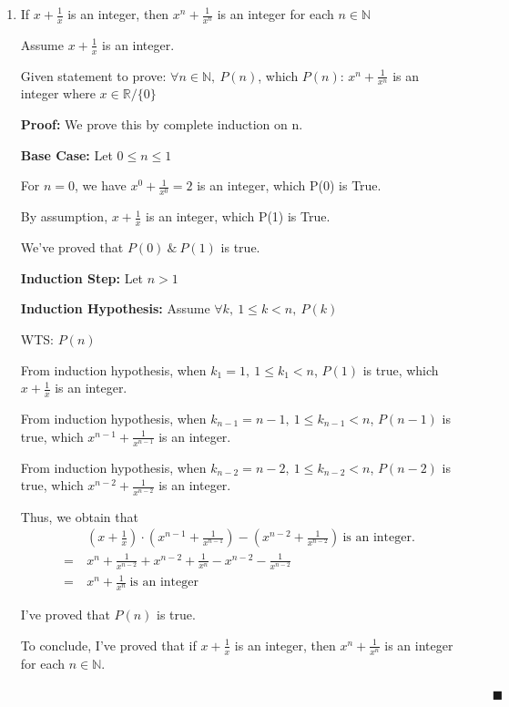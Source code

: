 \documentclass[12pt]{article}
\begin{document}
\begin{enumerate}[label=(\alph*)]
    \item If $x+\frac{1}{x}$ is an integer, then $x^n + \frac{1}{x^n} $ is an integer for each $n \in \mathbb{N}$
    
    Assume $x+\frac{1}{x}$ is an integer.

    Given statement to prove: $\forall n \in \mathbb{N},\ P(n)$, which $P(n)$: $x^n + \frac{1}{x^n}$ is an integer where $x \in \mathbb{R} / \{0\}$

    \textbf{Proof:} We prove this by complete induction on n.

    \textbf{Base Case:} Let $0 \leq n \leq 1$

    For $n=0$, we have $x^0 + \frac{1}{x^0} = 2$ is an integer, which P(0) is True.

    By assumption, $x + \frac{1}{x}$ is an integer, which P(1) is True.

    We've proved that $P(0)\ \&\ P(1)$ is true.

    \textbf{Induction Step:} Let $n > 1$
    
    \textbf{Induction Hypothesis:} Assume $\forall k,\ 1 \leq k < n,\ P(k)$

    WTS: $P(n)$

    From induction hypothesis, when $k_1 = 1,\ 1 \leq k_1 < n$, $P(1)$ is true, which $x + \frac{1}{x}$ is an integer.
    
    From induction hypothesis, when $k_{n-1} = n-1,\ 1 \leq k_{n-1} < n$, $P(n-1)$ is true, which $x^{n-1} + \frac{1}{x^{n-1}}$ is an integer.

    From induction hypothesis, when $k_{n-2} = n-2,\ 1 \leq k_{n-2} < n$, $P(n-2)$ is true, which $x^{n-2} + \frac{1}{x^{n-2}}$ is an integer.

    Thus, we obtain that 
    \begin{align*}
        &(x+\frac{1}{x})\cdot (x^{n-1} + \frac{1}{x^{n-1}}) - (x^{n-2} + \frac{1}{x^{n-2}})\ \text{is an integer.} \\
        =\ &x^n + \frac{1}{x^{n-2}} + x^{n-2} + \frac{1}{x^n} - x^{n-2} - \frac{1}{x^{n-2}} \\
        =\ &x^n + \frac{1}{x^n} \ \text{is an integer}
    \end{align*}

    I've proved that $P(n)$ is true.

    To conclude, I've proved that if $x+\frac{1}{x}$ is an integer, then $x^n + \frac{1}{x^n} $ is an integer for each $n \in \mathbb{N}$.

    $\quad \quad \quad \quad \quad \quad \quad \quad \quad \quad \quad \quad \quad \quad \quad \quad \quad \quad \quad \quad \quad \quad \quad \quad \quad \quad \quad \quad \quad \quad \quad \quad \quad \quad \quad \quad \quad \blacksquare $
\end{enumerate}
\end{document}
